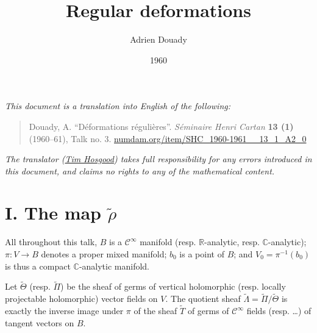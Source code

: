 \documentclass[british]{article}
\title{Regular deformations}
\author{Adrien Douady}
\date{1960}
\newcommand{\oldpage}[1]{\marginpar{\footnotesize$\Big\vert$ \textit{p.~#1}}}
\begin{document}
\maketitle
\thispagestyle{fancy}

\setcounter{footnote}{0}



\emph{This document is a translation into English of the following:}

\begin{quote}
Douady, A. ``Déformations régulières''. \emph{Séminaire Henri Cartan}
\textbf{13 (1)} (1960--61), Talk no. 3.
\href{https://www.numdam.org/item/SHC_1960-1961__13_1_A2_0}{numdam.org/item/SHC\_1960-1961\_\_13\_1\_A2\_0}
\end{quote}

\emph{The translator (\href{https://thosgood.net}{Tim Hosgood}) takes
full responsibility for any errors introduced in this document, and
claims no rights to any of the mathematical content.}

\tableofcontents

\providecommand{\scr}[1]{{\mathscr{#1}}}
\renewcommand{\cal}[1]{{\mathcal{#1}}}
\renewcommand{\frak}[1]{{\mathfrak{#1}}}
\renewcommand{\geq}{\geqslant}
\renewcommand{\leq}{\leqslant}

\providecommand{\ZZ}{\mathbb{Z}}
\providecommand{\RR}{\mathbb{R}}
\providecommand{\CC}{\mathbb{C}}
\providecommand{\DD}{\mathrm{D}}
\providecommand{\HH}{\mathrm{H}}
\providecommand{\PP}{\mathbb{P}}
\providecommand{\dd}{\mathrm{d}}

\providecommand{\Hom}{\operatorname{Hom}}
\providecommand{\GL}{\operatorname{GL}}
\providecommand{\SL}{\operatorname{SL}}
\providecommand{\Ker}{\operatorname{Ker}}

\section*{\texorpdfstring{I. The map
\(\widetilde{\rho}\)}{I. The map \textbackslash widetilde\{\textbackslash rho\}}}\label{three-section-I}

All throughout this talk, \(B\) is a \(\mathscr{C}^\infty\) manifold
(resp. \(\mathbb{R}\)-analytic, resp. \(\mathbb{C}\)-analytic);
\(\pi\colon V\to B\) denotes a proper mixed manifold; \(b_0\) is a point
of \(B\); and \(V_0=\pi^{-1}(b_0)\) is thus a compact
\(\mathbb{C}\)-analytic manifold. \oldpage{3-01}

Let \(\widetilde{\Theta}\) (resp. \(\widetilde{\Pi}\)) be the sheaf of
germs of vertical holomorphic (resp. locally projectable holomorphic)
vector fields on \(V\). The quotient sheaf
\(\widetilde{\Lambda}=\widetilde{\Pi}/\widetilde{\Theta}\) is exactly
the inverse image under \(\pi\) of the sheaf \(\widetilde{T}\) of germs
of \(\mathscr{C}^\infty\) fields (resp. \ldots) of tangent vectors on
\(B\).
\end{document}

